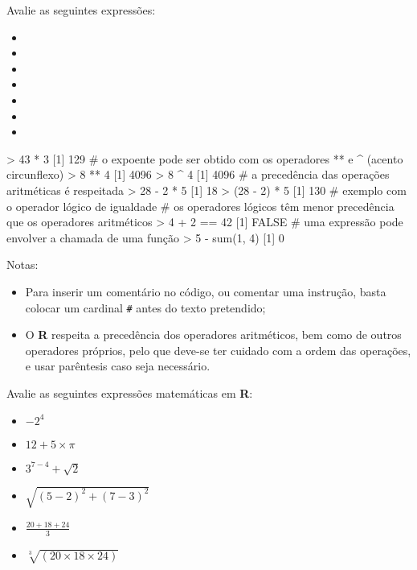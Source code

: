 \documentclass{exam}
\begin{document}
\begin{questions}
\question  Avalie as seguintes expressões: \
\begin{itemize}
\item {}
\item {}
\item {}
\item {}
\item {}
\item {}
\item {}
\end{itemize}

\begin{solution}
	\begin{rcode}
		> 43 * 3
		[1] 129
		# o expoente pode ser obtido com os operadores ** e ^ (acento circunflexo)
		> 8 ** 4
		[1] 4096
		> 8 ^ 4
		[1] 4096
		# a precedência das operações aritméticas é respeitada
		> 28 - 2 * 5
		[1] 18
		> (28 - 2) * 5
		[1] 130
		# exemplo com o operador lógico de igualdade
		# os operadores lógicos têm menor precedência que os operadores aritméticos
		> 4 + 2 == 42
		[1] FALSE
		# uma expressão pode envolver a chamada de uma função
		> 5 - sum(1, 4)
		[1] 0
	\end{rcode}
Notas:
\begin{itemize}
\item Para inserir um comentário no código, ou comentar uma instrução, basta colocar um cardinal \texttt{\#} antes do texto pretendido;
\item O \textbf{R} respeita a precedência dos operadores aritméticos, bem como de outros operadores próprios, pelo que deve-se ter cuidado com a ordem das operações, e usar parêntesis caso seja necessário.
\end{itemize}
\end{solution}

\question Avalie as seguintes expressões matemáticas em \textbf{R}:

\begin{itemize}
	\item ${-2}^4$
	\item $12 + 5 \times \pi$
	\item $3^{7-4}  + \sqrt{2}$
	\item $\sqrt{(5-2)^2 + (7-3)^2}$
	\item $\frac{20 + 18 + 24}{3}$
	\item $\sqrt[3]{(20 \times 18 \times 24)}$
	

\end{itemize}
\end{questions}
\end{document}
